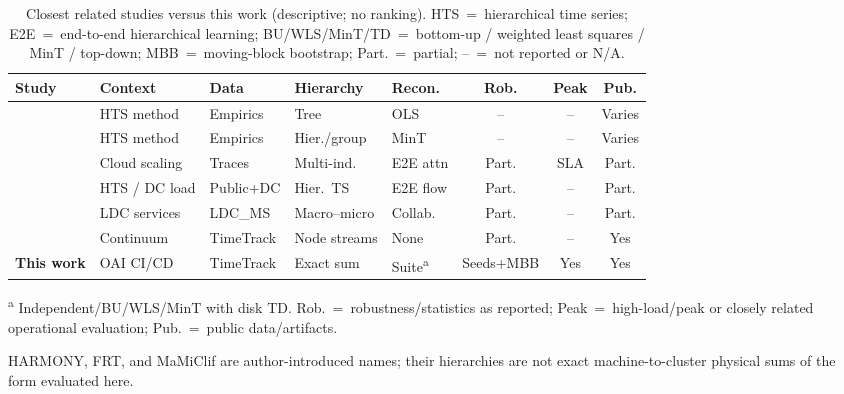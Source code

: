 \begin{table}[width=\textwidth,pos=t]
\centering
\caption{Closest related studies versus this work (descriptive; no ranking).
HTS~=~hierarchical time series; E2E~=~end-to-end hierarchical learning;
BU/{WLS}/MinT/{TD}~=~bottom-up / weighted least squares / MinT / top-down;
MBB~=~moving-block bootstrap; Part.~=~partial; --~=~not reported or N/A.}
\label{tab:related}
\begin{threeparttable}
\small
\setlength{\tabcolsep}{2.8pt}
\begin{tabularx}{\tblwidth}{@{}>{\raggedright\arraybackslash}p{1.85cm}>{\raggedright\arraybackslash}X>{\raggedright\arraybackslash}X>{\raggedright\arraybackslash}X>{\raggedright\arraybackslash}Xccc@{}}
\toprule
Study & Context & Data & Hierarchy & Recon. & Rob. & Peak & Pub. \\
\midrule
\cite{hyndman2011optimal} & HTS method & Empirics & Tree & OLS & -- & -- & Varies \\
\cite{wickramasuriya2019mint} & HTS method & Empirics & Hier./group & MinT & -- & -- & Varies \\
\cite{harmony2024} & Cloud scaling & Traces & Multi-ind. & E2E attn & Part. & SLA & Part. \\
\cite{wang2025frt} & HTS / DC load & Public+DC & Hier.\ TS & E2E flow & Part. & -- & Part. \\
\cite{gao2026mamiclif} & LDC services & LDC\_MS & Macro--micro & Collab. & Part. & -- & Part. \\
\cite{meliani2026zerotouch} & Continuum & TimeTrack & Node streams & None & Part. & -- & Yes \\
\textbf{This work} & OAI CI/CD & TimeTrack & Exact sum & Suite\textsuperscript{a} & Seeds+MBB & Yes & Yes \\
\bottomrule
\end{tabularx}
\begin{tablenotes}
\footnotesize
\item\textsuperscript{a} Independent/BU/{WLS}/MinT with disk {TD}.
Rob.~=~robustness/statistics as reported; Peak~=~high-load/peak or closely
related operational evaluation; Pub.~=~public data/artifacts.
\item {HARMONY}, {FRT}, and {MaMiClif} are author-introduced names; their
hierarchies are not exact machine-to-cluster physical sums of the form evaluated
here.
\end{tablenotes}
\end{threeparttable}
\end{table}

